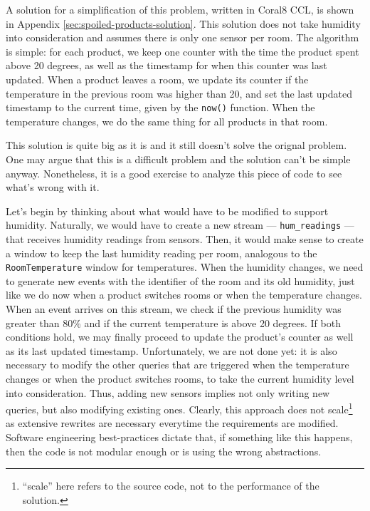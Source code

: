 \documentclass{report}
\begin{document}
A solution for a simplification of this problem, written in Coral8
CCL, is shown in Appendix \ref{sec:spoiled-products-solution}. This
solution does not take humidity into consideration and assumes there
is only one sensor per room. The algorithm is simple: for each
product, we keep one counter with the time the product spent above 20
degrees, as well as the timestamp for when this counter was last
updated. When a product leaves a room, we update its counter if the
temperature in the previous room was higher than 20, and set the last
updated timestamp to the current time, given by the \verb=now()=
function. When the temperature changes, we do the same thing for all
products in that room.

This solution is quite big as it is and it still doesn't solve the
orignal problem. One may argue that this is a difficult problem and
the solution can't be simple anyway. Nonetheless, it is a good
exercise to analyze this piece of code to see what's wrong with it.

Let's begin by thinking about what would have to be modified to
support humidity. Naturally, we would have to create a new stream ---
\verb=hum_readings= --- that receives humidity readings from
sensors. Then, it would make sense to create a window to keep the last
humidity reading per room, analogous to the \verb=RoomTemperature=
window for temperatures. When the humidity changes, we need to
generate new events with the identifier of the room and its old
humidity, just like we do now when a product switches rooms or when
the temperature changes. When an event arrives on this stream, we
check if the previous humidity was greater than 80\% and if the
current temperature is above 20 degrees. If both conditions hold, we
may finally proceed to update the product's counter as well as its
last updated timestamp. Unfortunately, we are not done yet: it is also
necessary to modify the other queries that are triggered when the
temperature changes or when the product switches rooms, to take the
current humidity level into consideration. Thus, adding new sensors
implies not only writing new queries, but also modifying existing
ones. Clearly, this approach does not scale\footnote{``scale'' here
  refers to the source code, not to the performance of the solution.}
as extensive rewrites are necessary everytime the requirements are
modified. Software engineering best-practices dictate that, if
something like this happens, then the code is not modular enough or is
using the wrong abstractions.
\end{document}
